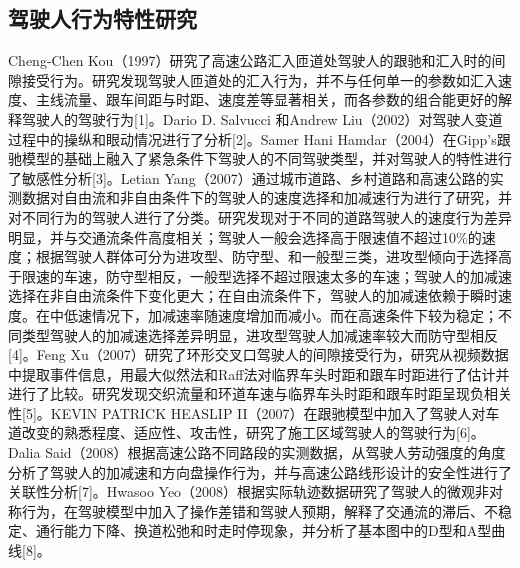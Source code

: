 \subsection{驾驶人行为特性研究}

Cheng-Chen Kou（1997）研究了高速公路汇入匝道处驾驶人的跟驰和汇入时的间隙接受行为。研究发现驾驶人匝道处的汇入行为，并不与任何单一的参数如汇入速度、主线流量、跟车间距与时距、速度差等显著相关，而各参数的组合能更好的解释驾驶人的驾驶行为[1]。Dario D. Salvucci 和Andrew Liu（2002）对驾驶人变道过程中的操纵和眼动情况进行了分析[2]。Samer Hani Hamdar（2004）在Gipp’s跟驰模型的基础上融入了紧急条件下驾驶人的不同驾驶类型，并对驾驶人的特性进行了敏感性分析[3]。Letian Yang（2007）通过城市道路、乡村道路和高速公路的实测数据对自由流和非自由条件下的驾驶人的速度选择和加减速行为进行了研究，并对不同行为的驾驶人进行了分类。研究发现对于不同的道路驾驶人的速度行为差异明显，并与交通流条件高度相关；驾驶人一般会选择高于限速值不超过10\%的速度；根据驾驶人群体可分为进攻型、防守型、和一般型三类，进攻型倾向于选择高于限速的车速，防守型相反，一般型选择不超过限速太多的车速；驾驶人的加减速选择在非自由流条件下变化更大；在自由流条件下，驾驶人的加减速依赖于瞬时速度。在中低速情况下，加减速率随速度增加而减小。而在高速条件下较为稳定；不同类型驾驶人的加减速选择差异明显，进攻型驾驶人加减速率较大而防守型相反[4]。Feng Xu（2007）研究了环形交叉口驾驶人的间隙接受行为，研究从视频数据中提取事件信息，用最大似然法和Raff法对临界车头时距和跟车时距进行了估计并进行了比较。研究发现交织流量和环道车速与临界车头时距和跟车时距呈现负相关性[5]。KEVIN PATRICK HEASLIP II（2007）在跟驰模型中加入了驾驶人对车道改变的熟悉程度、适应性、攻击性，研究了施工区域驾驶人的驾驶行为[6]。Dalia Said（2008）根据高速公路不同路段的实测数据，从驾驶人劳动强度的角度分析了驾驶人的加减速和方向盘操作行为，并与高速公路线形设计的安全性进行了关联性分析[7]。Hwasoo Yeo（2008）根据实际轨迹数据研究了驾驶人的微观非对称行为，在驾驶模型中加入了操作差错和驾驶人预期，解释了交通流的滞后、不稳定、通行能力下降、换道松弛和时走时停现象，并分析了基本图中的D型和A型曲线[8]。

